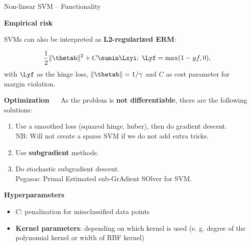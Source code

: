 \documentclass[11pt,compress,t,notes=noshow, xcolor=table]{beamer}
\newcommand{\highlight}[1]{\textcolor{highlightcol}{\textbf{#1}}}
\begin{document}
\begin{frame}{Non-linear SVM -- Functionality}

\footnotesize

\highlight{Empirical risk}

SVMs can also be interpreted as \textbf{L2-regularized ERM}: 

$$ \frac{1}{2} \|\thetab\|^2 + C \sumin \Lxyi ;\; \Lyf = \max(1-yf, 0),$$ 
with $\Lyf$ as the hinge loss, $\|\thetab\| = 1 / \gamma$ and $C$ as cost parameter for margin violation.

\medskip

\highlight{Optimization} ~~
As the problem is \textbf{not differentiable}, there are the following solutions: 
\begin{enumerate}
\item Use a smoothed loss (squared hinge, huber), then do gradient descent.\\
  NB: Will not  create a sparse SVM if we do not add extra tricks.
\item Use \textbf{subgradient} methods.
\item Do stochastic subgradient descent.\\
  Pegasos: Primal Estimated sub-GrAdient SOlver for SVM.
\end{enumerate}

\medskip


\highlight{Hyperparameters}

\begin{itemize}
  \item \textbf{$C$}: penalization for missclassified data points 
  \item \textbf{Kernel parameters}: depending on which kernel is used (e. g. degree of the polynomial kernel or width of RBF kernel)

\end{itemize}

\medskip




\end{frame}
\end{document}
